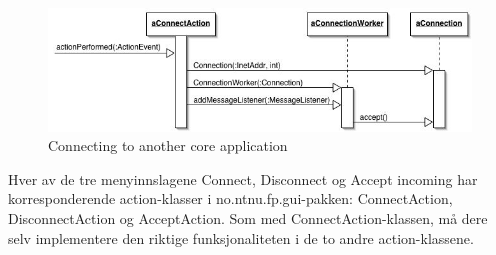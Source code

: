 \begin{figure}[H]
    \centering
    \includegraphics[width=\textwidth]{resources/sequence-connect-to-core-application.jpg}
    \caption{Connecting to another core application}
    \label{fig:sequence-connect-to-core-application}
\end{figure}

Hver av de tre menyinnslagene Connect, Disconnect og Accept incoming har korresponderende action-klasser i no.ntnu.fp.gui-pakken: ConnectAction, DisconnectAction og AcceptAction. Som med ConnectAction-klassen, må dere selv implementere den riktige funksjonaliteten i de to andre action-klassene.
